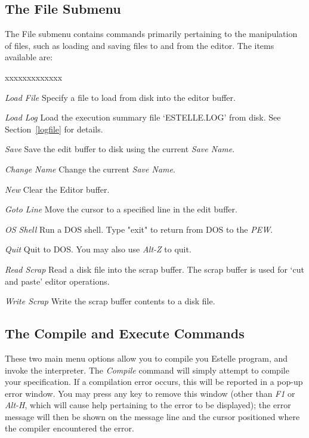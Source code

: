 \subsection[The File Submenu]{The File Submenu}

The File submenu contains commands primarily pertaining to the
manipulation of files, such as loading and saving files to and from
the editor. The items available are:

\label{filemenu}
\begin{describe}{xxxxxxxxxxxxx}
\item[\em Load File]Specify a file to load from disk into the editor
buffer.
\item[\em Load Log]Load the execution summary file `ESTELLE.LOG' from
disk. See Section~\ref{logfile} for details.
\item[\em Save]Save the edit buffer to disk using the current {\em Save
Name}.
\item[\em Change Name]Change the current {\em Save Name}.
\item[\em New]Clear the Editor buffer.
\item[\em Goto Line]Move the cursor to a specified line in the edit
buffer.
\item[\em OS Shell]Run a DOS shell. Type "exit" to return from DOS to
the {\em PEW}.
\item[\em Quit]Quit to DOS. You may also use {\em Alt-Z} to quit.
\item[\em Read Scrap]Read a disk file into the scrap buffer. The scrap
buffer is used for `cut and paste' editor operations.
\item[\em Write Scrap]Write the scrap buffer contents to a disk file.
\end{describe}

\subsection[The Compile and Execute Commands]{The Compile and Execute
Commands}

These two main menu options allow you to compile you Estelle program,
and invoke the interpreter. The {\em Compile} command will simply
attempt to compile your specification. If a compilation error
occurs, this will be reported in a pop-up error window. You may press
any key to remove this window (other than {\em F1} or {\em Alt-H},
which will cause help pertaining to the error to be displayed);
the error message will then be
shown on the message line and the cursor positioned where the
compiler encountered the error.

